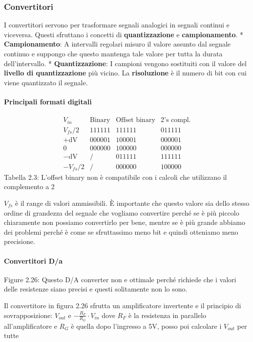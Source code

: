 \documentclass[
]{article}
\begin{document}
\subsubsection{Convertitori}\label{convertitori}

I convertitori servono per trasformare segnali analogici in segnali
continui e viceversa. Questi sfruttano i concetti di
\textbf{quantizzazione} e \textbf{campionamento}. *
\textbf{Campionamento}: A intervalli regolari misuro il valore assunto
dal segnale continuo e suppongo che questo mantenga tale valore per
tutta la durata dell'intervallo. * \textbf{Quantizzazione}: I campioni
vengono sostituiti con il valore del \textbf{livello di quantizzazione}
più vicino. La \textbf{risoluzione} è il numero di bit con cui viene
quantizzato il segnale.

\paragraph{Principali formati
digitali}\label{principali-formati-digitali}

\[\begin{array}{c|c|c|c}V_{in}&\text{Binary}&\text{Offset binary}&\text{2's compl.}\\\hline V_{fs}/2&111111&111111&011111\\+\text{dV}&000001&100001&000001\\0&000000&100000&000000\\-\text{dV}&/&011111&111111\\-V_{fs}/2&/&000000&100000\end{array}\]
Tabella 2.3: L'offset binary non è compatibile con i calcoli che
utilizzano il complemento a 2

\(V_{fs}\) è il range di valori ammissibili. È importante che questo
valore sia dello stesso ordine di grandezza del segnale che vogliamo
convertire perché se è più piccolo chiaramente non possiamo convertirlo
per bene, mentre se è più grande abbiamo dei problemi perché è come se
sfruttassimo meno bit e quindi otteniamo meno precisione.

\paragraph{Convertitori D/a}\label{convertitori-da}

Figure 2.26: Questo D/A converter non e ottimale perché richiede che i
valori delle resistenze siano precisi e questi solitamente non lo sono.

Il convertitore in figura 2.26 sfrutta un amplificatore invertente e il
principio di sovrapposizione: \(V_{out}\) e
\(-\frac{R_{F}}{R_{G}}\cdot V_{in}\) dove \(R_{F}\) è la resistenza in
parallelo all'amplificatore e \(R_{G}\) è quella dopo l'ingresso a 5V,
posso poi calcolare i \(V_{out}\) per tutte
\end{document}
